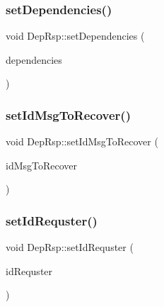 \subsubsection{\texorpdfstring{set\+Dependencies()}{setDependencies()}}
{\footnotesize\ttfamily void Dep\+Rsp\+::set\+Dependencies (\begin{DoxyParamCaption}\item[{const \hyperlink{dep_rsp__m_8h_a3c2ceb107008eb344443aaab2eb872b8}{id\+Dep\+Dep\+Rsp} \&}]{dependencies }\end{DoxyParamCaption})\hspace{0.3cm}{\ttfamily [virtual]}}

\mbox{\label{class_dep_rsp_a6aea88bdf4ba7b9c4876823278e880b0}} 
\subsubsection{\texorpdfstring{set\+Id\+Msg\+To\+Recover()}{setIdMsgToRecover()}}
{\footnotesize\ttfamily void Dep\+Rsp\+::set\+Id\+Msg\+To\+Recover (\begin{DoxyParamCaption}\item[{const \hyperlink{dep_rsp__m_8h_a8a41011e0821f196429cd4bc45638bcf}{id\+Msg\+Dep\+Rsp} \&}]{id\+Msg\+To\+Recover }\end{DoxyParamCaption})\hspace{0.3cm}{\ttfamily [virtual]}}

\mbox{\label{class_dep_rsp_a7029f3c6f0e1b230965a0143a3c9724e}} 
\subsubsection{\texorpdfstring{set\+Id\+Requster()}{setIdRequster()}}
{\footnotesize\ttfamily void Dep\+Rsp\+::set\+Id\+Requster (\begin{DoxyParamCaption}\item[{unsigned int}]{id\+Requster }\end{DoxyParamCaption})\hspace{0.3cm}{\ttfamily [virtual]}}



